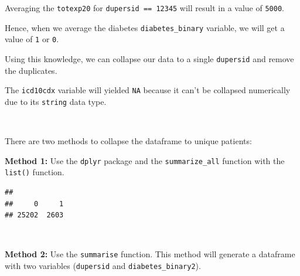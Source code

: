 \documentclass[
]{book}
\newenvironment{Shaded}{\begin{snugshade}}{\end{snugshade}}
\newcommand{\AttributeTok}[1]{\textcolor[rgb]{0.77,0.63,0.00}{#1}}
\newcommand{\DocumentationTok}[1]{\textcolor[rgb]{0.56,0.35,0.01}{\textbf{\textit{#1}}}}
\newcommand{\FunctionTok}[1]{\textcolor[rgb]{0.00,0.00,0.00}{#1}}
\newcommand{\NormalTok}[1]{#1}
\newcommand{\OtherTok}[1]{\textcolor[rgb]{0.56,0.35,0.01}{#1}}
\newcommand{\SpecialCharTok}[1]{\textcolor[rgb]{0.00,0.00,0.00}{#1}}
\theoremstyle{definition}
\theoremstyle{definition}
\theoremstyle{definition}
\theoremstyle{definition}
\theoremstyle{remark}
\begin{document}
Averaging the \texttt{totexp20} for \texttt{dupersid\ ==\ 12345} will result in a value of \texttt{5000}.

Hence, when we average the diabetes \texttt{diabetes\_binary} variable, we will get a value of \texttt{1} or \texttt{0}.

Using this knowledge, we can collapse our data to a single \texttt{dupersid} and remove the duplicates.

The \texttt{icd10cdx} variable will yielded \texttt{NA} because it can't be collapsed numerically due to its \texttt{string} data type.

\(~\)

There are two methods to collapse the dataframe to unique patients:

\textbf{Method 1:} Use the \texttt{dplyr} package and the \texttt{summarize\_all} function with the \texttt{list()} function.

\begin{Shaded}
\end{Shaded}

\begin{verbatim}
## 
##     0     1 
## 25202  2603
\end{verbatim}

\(~\)

\textbf{Method 2:} Use the \texttt{summarise} function. This method will generate a dataframe with two variables (\texttt{dupersid} and \texttt{diabetes\_binary2}).

\begin{Shaded}
\end{Shaded}
\end{document}
